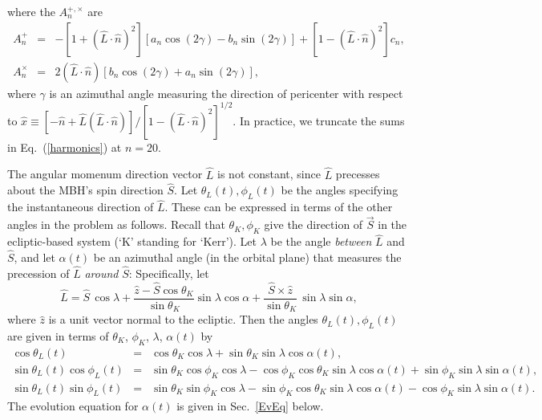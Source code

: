 \documentclass[11pt]{report}
\def\be{\begin{equation}}
\def\ee{\end{equation}}
\begin{document}
where the $A^{+,\times}_n$ are
\begin{eqnarray} \label{A}
A^{+}_n &=&-[1+({ \hat L}\cdot{ \hat n})^2]\left[
a_n\cos(2\gamma)-b_n\sin(2\gamma)\right]
+[1-({ \hat L}\cdot{ \hat n})^2]c_n, \nonumber\\
A^{\times}_n&=& 2({ \hat L}\cdot{ \hat n})\left[
b_n \cos(2\gamma)+a_n \sin(2\gamma)\right],
\end{eqnarray}
where $\gamma$ is an azimuthal angle measuring the direction of
pericenter with respect to
$\hat x \equiv [-\hat n + \hat L (\hat L\cdot \hat n)]
/[1-(\hat L\cdot \hat n)^2]^{1/2}$.  In practice, we truncate the sums in Eq.~(\ref{harmonics})
at $n=20$.

The angular momenum direction vector $\hat L$ is not constant, since $\hat L$ precesses about the MBH's spin
direction $\hat S$.  Let $\theta_L(t),\phi_L(t)$ be the angles specifying the instantaneous
direction of $\hat L$.  These can be expressed in terms of the other angles in the problem
as follows.
Recall that  $\theta_K,\phi_K$  give the direction of $\vec S$ in the ecliptic-based
system (`K' standing for `Kerr'). 
Let $\lambda$ be the angle {\it between} $\hat L$ and $\hat S$, and let
$\alpha(t)$ be an azimuthal angle (in the orbital plane) that measures the
precession of $\hat L$ {\it around} $\hat S$:
Specifically, let
\be \label{alpha}
\hat L = \hat S \, \cos\lambda +
\frac{\hat z - \hat S \cos\theta_K}{\sin\theta_K} \sin\lambda \cos\alpha
+ \frac{\hat S \times \hat z}{\sin\theta_K}  \, \sin\lambda \sin\alpha,
\ee
\noindent
where $\hat z$ is a unit vector normal to the ecliptic. Then the angles
$\theta_L(t),\phi_L(t)$ are given in terms of $\theta_K$, $\phi_K$,
$\lambda$, $\alpha(t)$ by
\begin{eqnarray}\label{relations3}
\cos\theta_L(t) &=& \cos\theta_K \cos\lambda
    +\sin\theta_K\sin\lambda\cos\alpha(t), \nonumber\\
\sin\theta_L(t)\cos\phi_L(t) &=&
\sin\theta_K\cos\phi_K\cos\lambda
-\cos\phi_K\cos\theta_K\sin\lambda\cos\alpha(t)
+\sin\phi_K\sin\lambda\sin\alpha(t),  \nonumber\\
\sin\theta_L(t)\sin\phi_L(t) &=&
\sin\theta_K\sin\phi_K\cos\lambda
-\sin\phi_K\cos\theta_K\sin\lambda\cos\alpha(t)
-\cos\phi_K\sin\lambda\sin\alpha(t) .
\end{eqnarray}
The evolution equation for $\alpha(t)$ is given in Sec.\  \ref{EvEq} below.
\end{document}
